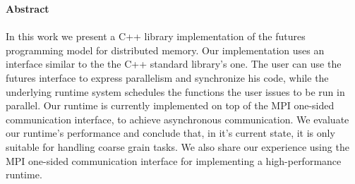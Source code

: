 \thispagestyle{empty}
\begin{titlepage}
\begin{center}
{\bf\Large Abstract}\\
\end{center}

\paragraph{}
In this work we present a C++ library implementation of the futures programming model for distributed memory.
Our implementation uses an interface similar to the the C++ standard library's one.  The user can use the 
futures interface to express parallelism and synchronize his code, while the underlying runtime system
schedules the functions the user issues to be run in parallel.  Our runtime is currently implemented on top
of the MPI one-sided communication interface, to achieve asynchronous communication.  We evaluate our runtime's
performance and conclude that, in it's current state, it is only suitable for handling coarse grain tasks.
We also share our experience using the MPI one-sided communication interface for implementing a high-performance
runtime. 

\vfill
\end{titlepage}

